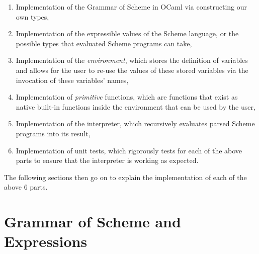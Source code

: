 \begin{enumerate}
   \item Implementation of the Grammar of Scheme in OCaml via constructing our own types,
   \item Implementation of the expressible values of the Scheme language, or the possible types that evaluated Scheme programs can take,
   \item Implementation of the \textit{environment}, which stores the definition of variables and allows for the user to re-use the values of these stored variables via the invocation of these variables’ names,
   \item Implementation of \textit{primitive} functions, which are functions that exist as native built-in functions inside the environment that can be used by the user,
   \item Implementation of the interpreter, which recursively evaluates parsed Scheme programs into its result,
   \item Implementation of unit tests, which rigorously tests for each of the above parts to ensure that the interpreter is working as expected.
\end{enumerate}
The following sections then go on to explain the implementation of each of the above 6 parts.

\pagebreak
\section{Grammar of Scheme and Expressions}
